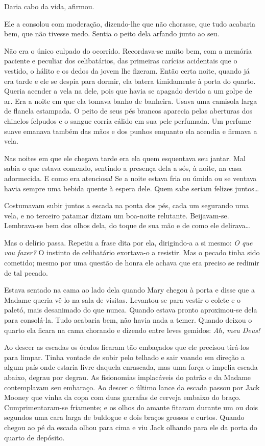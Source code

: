 Daria cabo da vida, afirmou.

Ele a consolou com moderação, dizendo-lhe que não chorasse, que tudo acabaria
bem, que não tivesse medo.  Sentia o peito dela arfando junto ao seu.

Não era o único culpado do ocorrido.  Recordava-se muito bem, com a memória
paciente e peculiar dos celibatários, das primeiras carícias acidentais que o
vestido, o hálito e os dedos da jovem lhe fizeram.  Então certa noite, quando
já era tarde e ele se despia para dormir, ela batera timidamente à porta do
quarto.  Queria acender a vela na dele, pois que havia se apagado devido a um
golpe de ar.  Era a noite em que ela tomava banho de banheira.  Usava uma
camisola larga de flanela estampada.  O peito de seus pés brancos aparecia
pelas aberturas dos chinelos felpudos e o sangue corria cálido em sua pele
perfumada.  Um perfume suave emanava também das mãos e dos punhos enquanto ela
acendia e firmava a vela.

Nas noites em que ele chegava tarde era ela quem esquentava seu jantar.  Mal
sabia o que estava comendo, sentindo a presença dela a sós, à noite, na casa
adormecida.  E como era atenciosa!  Se a noite estava fria ou úmida ou se
ventava havia sempre uma bebida quente à espera dele.  Quem sabe seriam felizes
juntos\ldots{}

Costumavam subir juntos a escada na ponta dos pés, cada um segurando uma vela,
e no terceiro patamar diziam um boa-noite relutante.  Beijavam-se.  Lembrava-se
bem dos olhos dela, do toque de sua mão e de como ele delirava\ldots{}

Mas o delírio passa.  Repetiu a frase dita por ela, dirigindo-a a si mesmo:
\textit{O que vou fazer?}  O instinto de celibatário exortava-o a resistir.
Mas o pecado tinha sido cometido; mesmo por uma questão de honra ele achava que
era preciso se redimir de tal pecado.

Estava sentado na cama ao lado dela quando Mary chegou à porta e disse que a
Madame queria vê-lo na sala de visitas.  Levantou-se para vestir o colete e o
paletó, mais desanimado do que nunca.  Quando estava pronto aproximou-se dela
para consolá-la.  Tudo acabaria bem, não havia nada a temer.  Quando deixou o
quarto ela ficara na cama chorando e dizendo entre leves gemidos: \textit{Ah,
meu Deus!}

Ao descer as escadas os óculos ficaram tão embaçados que ele precisou tirá-los
para limpar.  Tinha vontade de subir pelo telhado e sair voando em direção a
algum país onde estaria livre daquela enrascada, mas uma força o impelia escada
abaixo, degrau por degrau.  As fisionomias implacáveis do patrão e da Madame
contemplavam seu embaraço.  Ao descer o último lance da escada passou por Jack
Mooney que vinha da copa com duas garrafas de cerveja embaixo do braço.
Cumprimentaram-se friamente; e os olhos do amante fitaram durante um ou dois
segundos uma cara larga de buldogue e dois braços grossos e curtos.  Quando
chegou ao pé da escada olhou para cima e viu Jack olhando para ele da porta do
quarto de depósito.

